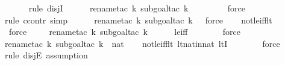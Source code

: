 \begin{isabellebody}
\ \ \ \ \ \isamarkupfalse%
{\isacharparenleft}{\kern0pt}rule\ disjI{}{\isacharparenright}{\kern0pt}{\isacharplus}{\kern0pt}\isanewline
\ \ \ \ \ \isamarkupfalse%
{\isacharparenleft}{\kern0pt}rename{\isacharunderscore}{\kern0pt}tac\ k{\isacharcomma}{\kern0pt}\ subgoal{\isacharunderscore}{\kern0pt}tac\ {\isachardoublequoteopen}k\ {\isasymnotin}\ {}{\isachardoublequoteclose}{\isacharparenright}{\kern0pt}\isanewline
\ \ \ \ \ \ \isamarkupfalse%
{\isacharparenleft}{\kern0pt}force{\isacharparenright}{\kern0pt}\isanewline
\ \ \ \ \ \isamarkupfalse%
{\isacharparenleft}{\kern0pt}rule\ ccontr{\isacharcomma}{\kern0pt}\ simp{\isacharparenright}{\kern0pt}\isanewline
\ \ \ \ \ \isamarkupfalse%
{\isacharparenleft}{\kern0pt}rename{\isacharunderscore}{\kern0pt}tac\ k{\isacharcomma}{\kern0pt}\ subgoal{\isacharunderscore}{\kern0pt}tac\ {\isachardoublequoteopen}k\ {\isacharless}{\kern0pt}\ {}{\isachardoublequoteclose}{\isacharcomma}{\kern0pt}\ force{\isacharparenright}{\kern0pt}\isanewline
\ \ \isamarkupfalse%
\ not{\isacharunderscore}{\kern0pt}le{\isacharunderscore}{\kern0pt}iff{\isacharunderscore}{\kern0pt}lt\ \isanewline
\ \ \ \ \ \isamarkupfalse%
\ force\isanewline
\ \ \ \ \isamarkupfalse%
{\isacharparenleft}{\kern0pt}rename{\isacharunderscore}{\kern0pt}tac\ k{\isacharcomma}{\kern0pt}\ subgoal{\isacharunderscore}{\kern0pt}tac\ {\isachardoublequoteopen}k\ {\isacharless}{\kern0pt}\ {}{\isachardoublequoteclose}{\isacharparenright}{\kern0pt}\isanewline
\ \ \isamarkupfalse%
\ le{\isacharunderscore}{\kern0pt}iff\ \isanewline
\ \ \ \ \ \isamarkupfalse%
\ force\ \isanewline
\ \ \ \ \isamarkupfalse%
{\isacharparenleft}{\kern0pt}rename{\isacharunderscore}{\kern0pt}tac\ k{\isacharcomma}{\kern0pt}\ subgoal{\isacharunderscore}{\kern0pt}tac\ {\isachardoublequoteopen}k\ {\isasymin}\ nat{\isachardoublequoteclose}{\isacharparenright}{\kern0pt}\isanewline
\ \ \isamarkupfalse%
\ not{\isacharunderscore}{\kern0pt}le{\isacharunderscore}{\kern0pt}iff{\isacharunderscore}{\kern0pt}lt\ lt{\isacharunderscore}{\kern0pt}nat{\isacharunderscore}{\kern0pt}in{\isacharunderscore}{\kern0pt}nat\ ltI\ \isanewline
\ \ \ \ \ \isamarkupfalse%
\ force\ \isanewline
\ \ \ \ \isamarkupfalse%
{\isacharparenleft}{\kern0pt}rule\ disjE{\isacharcomma}{\kern0pt}\ assumption{\isacharparenright}{\kern0pt}\isanewline
\ \ \isamarkupfalse%

\end{isabellebody}
